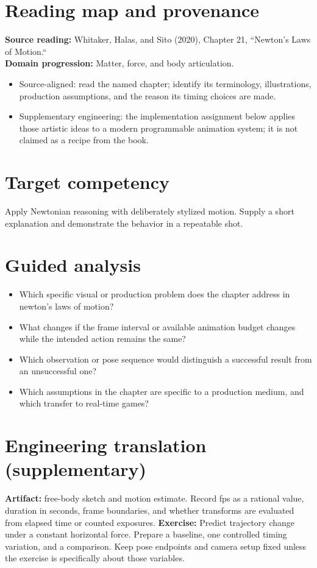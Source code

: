 \documentclass[10pt,letterpaper]{article}
\begin{document}
\makedoctitle
\makedocsummary

\section{Reading map and provenance}
\textbf{Source reading:} Whitaker, Halas, and Sito (2020), Chapter 21, ``Newton’s Laws of Motion.``\\
\textbf{Domain progression:} Matter, force, and body articulation.
\begin{itemize}
\item Source-aligned: read the named chapter; identify its terminology, illustrations, production assumptions, and the reason its timing choices are made.
\item Supplementary engineering: the implementation assignment below applies those artistic ideas to a modern programmable animation system; it is not claimed as a recipe from the book.
\end{itemize}
\section{Target competency}
Apply Newtonian reasoning with deliberately stylized motion. Supply a short explanation and demonstrate the behavior in a repeatable shot.
\section{Guided analysis}
\begin{itemize}
\item Which specific visual or production problem does the chapter address in newton’s laws of motion?
\item What changes if the frame interval or available animation budget changes while the intended action remains the same?
\item Which observation or pose sequence would distinguish a successful result from an unsuccessful one?
\item Which assumptions in the chapter are specific to a production medium, and which transfer to real-time games?
\end{itemize}
\section{Engineering translation (supplementary)}
\textbf{Artifact:} free-body sketch and motion estimate. Record fps as a rational value, duration in seconds, frame boundaries, and whether transforms are evaluated from elapsed time or counted exposures.
\textbf{Exercise:} Predict trajectory change under a constant horizontal force. Prepare a baseline, one controlled timing variation, and a comparison. Keep pose endpoints and camera setup fixed unless the exercise is specifically about those variables.
\end{document}
